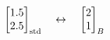 \documentclass[preview]{standalone}
\begin{document}
\begin{align*}
\begin{bmatrix}1.5\\2.5\end{bmatrix}_{\rm std} \quad\leftrightarrow\quad \begin{bmatrix}2\\1\end{bmatrix}_{B}
\end{align*}
\end{document}
